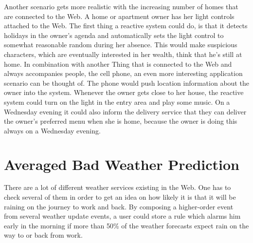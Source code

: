 Another scenario gets more realistic with the increasing number of homes that are connected to the Web.
A home or apartment owner has her light controls attached to the Web.
The first thing a reactive system could do, is that it detects holidays in the owner's agenda and automatically sets the light control to somewhat reasonable random during her absence.
This would make suspicious characters, which are eventually interested in her wealth, think that he's still at home.
In combination with another \textrm{Thing} that is connected to the Web and always accompanies people, the cell phone, an even more interesting application scenario can be thought of.
The phone would push location information about the owner into the system.
Whenever the owner gets close to her house, the reactive system could turn on the light in the entry area and play some music.
On a Wednesday evening it could also inform the delivery service that they can deliver the owner's preferred menu when she is home, because the owner is doing this always on a Wednesday evening.




\section{Averaged Bad Weather Prediction}
There are a lot of different weather services existing in the Web.
One has to check several of them in order to get an idea on how likely it is that it will be raining on the journey to work and back.
By composing a higher-order event from several weather update events, a user could store a rule which alarms him early in the morning if more than 50\% of the weather forecasts expect rain on the way to or back from work.
